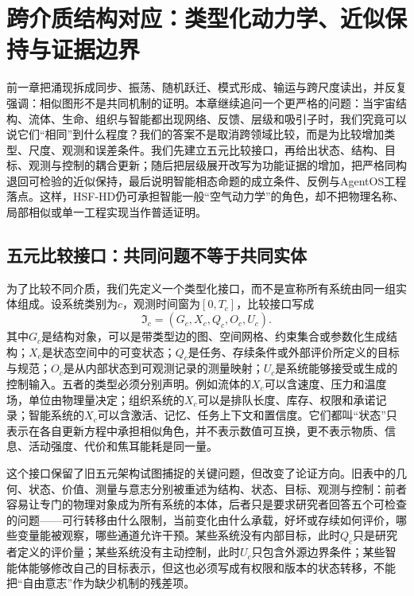 \chapter{跨介质结构对应：类型化动力学、近似保持与证据边界}
\label{chp:structural_isomorphism_principle}

前一章把涌现拆成同步、振荡、随机跃迁、模式形成、输运与跨尺度读出，并反复强调：相似图形不是共同机制的证明。本章继续追问一个更严格的问题：当宇宙结构、流体、生命、组织与智能都出现网络、反馈、层级和吸引子时，我们究竟可以说它们“相同”到什么程度？我们的答案不是取消跨领域比较，而是为比较增加类型、尺度、观测和误差条件。我们先建立五元比较接口，再给出状态、结构、目标、观测与控制的耦合更新；随后把层级展开改写为功能证据的增加，把严格同构退回可检验的近似保持，最后说明智能相态命题的成立条件、反例与AgentOS工程落点。这样，HSF-HD仍可承担智能一般“空气动力学”的角色，却不把物理名称、局部相似或单一工程实现当作普适证明。

\section{五元比较接口：共同问题不等于共同实体}
\label{sec:five_ary_architecture}

为了比较不同介质，我们先定义一个类型化接口，而不是宣称所有系统由同一组实体组成。设系统类别为$c$，观测时间窗为$[0,T_c]$，比较接口写成
\[
\mathfrak{I}_c=(G_c,X_c,Q_c,O_c,U_c).
\]
其中$G_c$是结构对象，可以是带类型边的图、空间网格、约束集合或参数化生成结构；$X_c$是状态空间中的可变状态；$Q_c$是任务、存续条件或外部评价所定义的目标与规范；$O_c$是从内部状态到可观测记录的测量映射；$U_c$是系统能够接受或生成的控制输入。五者的类型必须分别声明。例如流体的$X_c$可以含速度、压力和温度场，单位由物理量决定；组织系统的$X_c$可以是排队长度、库存、权限和承诺记录；智能系统的$X_c$可以含激活、记忆、任务上下文和置信度。它们都叫“状态”只表示在各自更新方程中承担相似角色，并不表示数值可互换，更不表示物质、信息、活动强度、代价和焦耳能耗是同一量。

这个接口保留了旧五元架构试图捕捉的关键问题，但改变了论证方向。旧表中的几何、状态、价值、测量与意志分别被重述为结构、状态、目标、观测与控制：前者容易让专门的物理对象成为所有系统的本体，后者只是要求研究者回答五个可检查的问题——可行转移由什么限制，当前变化由什么承载，好坏或存续如何评价，哪些变量能被观察，哪些通道允许干预。某些系统没有内部目标，此时$Q_c$只是研究者定义的评价量；某些系统没有主动控制，此时$U_c$只包含外源边界条件；某些智能体能够修改自己的目标表示，但这也必须写成有权限和版本的状态转移，不能把“自由意志”作为缺少机制的残差项。

